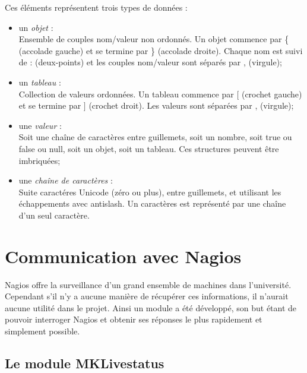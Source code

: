 \noindent Ces \'el\'ements repr\'esentent trois types de donn\'ees :

\begin{itemize}
	\item un \textit{objet} :\\Ensemble de couples nom/valeur non ordonn\'es. Un objet commence par \textsf{\{ (accolade gauche)} et se termine par \textsf{\} (accolade droite)}.
	Chaque nom est suivi de \textsf{: (deux-points)} et les couples nom/valeur sont s\'epar\'es par \textsf{, (virgule)};
	\item un \textit{tableau} :\\Collection de valeurs ordonn\'ees. Un tableau commence par \textsf{$[$ (crochet gauche)} et se termine par \textsf{$]$ (crochet droit)}.
	Les valeurs sont s\'epar\'ees par \textsf{, (virgule)};
	\item une \textit{valeur} :\\Soit une \textsf{cha\^ine de caract\`eres} entre guillemets, soit un \textsf{nombre}, soit \textsf{true} ou \textsf{false} ou \textsf{null}, soit un \textsf{objet}, soit un \textsf{tableau}.
	Ces structures peuvent \^etre imbriqu\'ees;
	\item une \textit{cha\^ine de caract\`eres} :\\Suite caract\'eres Unicode (z\'ero ou plus), entre guillemets, et utilisant les \'echappements avec antislash. 
	Un caract\`eres est repr\'esent\'e par une cha\^ine d'un seul caract\`ere.

\end{itemize}

\section{Communication avec Nagios}

Nagios offre la surveillance d'un grand ensemble de machines dans l'universit\'e. 
Cependant s'il n'y a aucune mani\`ere de r\'ecup\'erer ces informations, il n'aurait aucune utilit\'e dans le projet.
Ainsi un module a \'et\'e d\'evelopp\'e, son but \'etant de pouvoir interroger Nagios et obtenir ses r\'eponses le plus rapidement et simplement possible.

\subsection{Le module MKLivestatus}
\label{section:moduleMKLivestatus}

